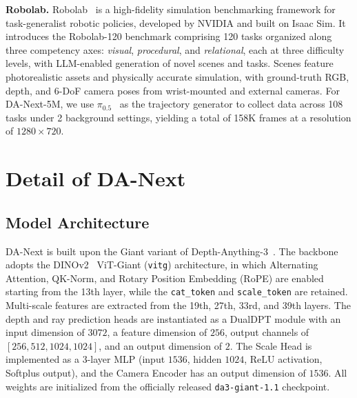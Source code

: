 \documentclass{llmxive}
\providecommand{\dataset}{DA-Next-5M\xspace}
\providecommand{\ours}{DA-Next\xspace}
\begin{document}
\textbf{Robolab.}
Robolab~\citep{yang2026robolab} is a high-fidelity simulation benchmarking framework for task-generalist robotic policies, developed by NVIDIA and built on Isaac Sim.
%
It introduces the Robolab-120 benchmark comprising 120 tasks organized along three competency axes: \textit{visual}, \textit{procedural}, and \textit{relational}, each at three difficulty levels, with LLM-enabled generation of novel scenes and tasks.
%
Scenes feature photorealistic assets and physically accurate simulation, with ground-truth RGB, depth, and 6-DoF camera poses from wrist-mounted and external cameras.
%
For \dataset, we use $\pi_{0.5}$~\citep{intelligence2025pi05} as the trajectory generator to collect data across 108 tasks under 2 background settings, yielding a total of 158K frames at a resolution of $1280 \times 720$.

\section{Detail of \ours}
\label{appendix:dan}
\subsection{Model Architecture}
\ours is built upon the Giant variant of Depth-Anything-3~\citep{lin2025depth}.
%
The backbone adopts the DINOv2~\citep{oquab2023dinov2} ViT-Giant (\texttt{vitg}) architecture, in which Alternating Attention, QK-Norm, and Rotary Position Embedding (RoPE) are enabled starting from the 13th layer, while the \texttt{cat\_token} and \texttt{scale\_token} are retained. 
%
Multi-scale features are extracted from the 19th, 27th, 33rd, and 39th layers. 
%
The depth and ray prediction heads are instantiated as a DualDPT module with an input dimension of $3072$, a feature dimension of $256$, output channels of $[256, 512, 1024, 1024]$, and an output dimension of $2$.
%
The Scale Head is implemented as a 3-layer MLP (input $1536$, hidden $1024$, ReLU activation, Softplus output), and the Camera Encoder has an output dimension of $1536$. 
%
All weights are initialized from the officially released \texttt{da3-giant-1.1} checkpoint.
\end{document}
